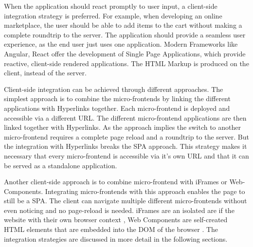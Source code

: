 When the application should react promptly to user input, a client-side integration strategy is preferred. For example, when developing an online marketplace, the user should be able to add items to the cart without making a complete roundtrip to the server. The application should provide a seamless user experience, as the end user just uses one application. Modern Frameworks like Angular, React offer the development of Single Page Applications, which provide reactive, client-side rendered applications. The HTML Markup is produced on the client, instead of the server. \cite{book:2020:geers:background:micro-frontends:micro-frontends-in-action}

Client-side integration can be achieved through different approaches. The simplest approach is to combine the micro-frontends by linking the different applications with Hyperlinks together. Each micro-frontend is deployed and accessible via a different URL. The different micro-frontend applications are then linked together with Hyperlinks. As the approach implies the switch to another micro-frontend requires a complete page reload and a roundtrip to the server. But the integration with Hyperlinks breaks the SPA approach. This strategy makes it necessary that every micro-frontend is accessible via it's own URL and that it can be served as a standalone application.

Another client-side approach is to combine micro-frontend with iFrames or Web-Components. Integrating micro-frontends with this approach enables the page to still be a SPA. The client can navigate multiple different micro-frontends without even noticing and no page-reload is needed. iFrames are an isolated are if the website with their own browser context \cite{book:2020:geers:background:micro-frontends:micro-frontends-in-action}, Web Components are self-created HTML elements that are embedded into the DOM of the browser \cite{book:2019:farrell:background:micro-frontends:web-components-in-action}. The integration strategies are discussed in more detail in the following sections. 
